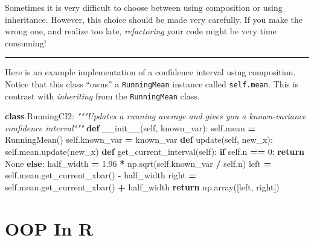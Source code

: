 \documentclass[
  12pt,
  krantz2]{krantz}
\makeatletter
\newenvironment{Shaded}{\begin{snugshade}}{\end{snugshade}}
\newcommand{\CommentTok}[1]{\textcolor[rgb]{0.37,0.37,0.37}{\textit{#1}}}
\newcommand{\ControlFlowTok}[1]{\textcolor[rgb]{0.27,0.27,0.27}{\textbf{#1}}}
\newcommand{\DecValTok}[1]{\textcolor[rgb]{0.06,0.06,0.06}{#1}}
\newcommand{\FloatTok}[1]{\textcolor[rgb]{0.06,0.06,0.06}{#1}}
\newcommand{\FunctionTok}[1]{\textcolor[rgb]{0,0,0}{#1}}
\newcommand{\KeywordTok}[1]{\textcolor[rgb]{0.27,0.27,0.27}{\textbf{#1}}}
\newcommand{\NormalTok}[1]{#1}
\newcommand{\OperatorTok}[1]{\textcolor[rgb]{0.43,0.43,0.43}{\textbf{#1}}}
\newcommand{\VariableTok}[1]{\textcolor[rgb]{0,0,0}{#1}}
\newenvironment{kframe}{%
\medskip{}
\setlength{\fboxsep}{.8em}
 \def\at@end@of@kframe{}%
 \ifinner\ifhmode%
  \def\at@end@of@kframe{\end{minipage}}%
  \begin{minipage}{\columnwidth}%
 \fi\fi%
 \def\FrameCommand##1{\hskip\@totalleftmargin \hskip-\fboxsep
 \colorbox{shadecolor}{##1}\hskip-\fboxsep
     \hskip-\linewidth \hskip-\@totalleftmargin \hskip\columnwidth}%
 \MakeFramed {\advance\hsize-\width
   \@totalleftmargin\z@ \linewidth\hsize
   \@setminipage}}%
 {\par\unskip\endMakeFramed%
 \at@end@of@kframe}
\renewenvironment{Shaded}{\begin{kframe}}{\end{kframe}}
\newenvironment{rmd-caution}{\begin{lrbox}{\rmdbox}
  \minipage[c]{\dimexpr \textwidth-2\fboxrule-\wd\excl-\columnsep}
    \vspace*{\columnsep}}%
{\vspace*{\columnsep}\endminipage\end{lrbox}%
  {\par\color{yellow}\fboxsep=0pt
    \fbox{\usebox\excl\usebox\rmdbox\hspace{\columnsep}}\par}}
\makeatother
\begin{document}
\begin{rmd-caution}
Sometimes it is very difficult to choose between using composition or using inheritance. However, this choice should be made very carefully. If you make the wrong one, and realize too late, \emph{refactoring} your code might be very time consuming!

\end{rmd-caution}

\begin{center}\rule{0.5\linewidth}{0.5pt}\end{center}

Here is an example implementation of a confidence interval using composition. Notice that this class ``owns'' a \texttt{RunningMean} instance called \texttt{self.mean}. This is contrast with \emph{inheriting} from the \texttt{RunningMean} class.

\begin{Shaded}
\begin{Highlighting}[]
\KeywordTok{class}\NormalTok{ RunningCI2:}
  \CommentTok{"""Updates a running average and }
\CommentTok{  gives you a known{-}variance confidence interval"""}
  \KeywordTok{def} \FunctionTok{\_\_init\_\_}\NormalTok{(}\VariableTok{self}\NormalTok{, known\_var):}
    \VariableTok{self}\NormalTok{.mean }\OperatorTok{=}\NormalTok{ RunningMean()}
    \VariableTok{self}\NormalTok{.known\_var }\OperatorTok{=}\NormalTok{ known\_var}
  \KeywordTok{def}\NormalTok{ update(}\VariableTok{self}\NormalTok{, new\_x):    }
    \VariableTok{self}\NormalTok{.mean.update(new\_x)}
  \KeywordTok{def}\NormalTok{ get\_current\_interval(}\VariableTok{self}\NormalTok{):}
    \ControlFlowTok{if} \VariableTok{self}\NormalTok{.n }\OperatorTok{==} \DecValTok{0}\NormalTok{:}
      \ControlFlowTok{return} \VariableTok{None}
    \ControlFlowTok{else}\NormalTok{:}
\NormalTok{      half\_width }\OperatorTok{=} \FloatTok{1.96} \OperatorTok{*}\NormalTok{ np.sqrt(}\VariableTok{self}\NormalTok{.known\_var }\OperatorTok{/} \VariableTok{self}\NormalTok{.n)  }
\NormalTok{      left }\OperatorTok{=} \VariableTok{self}\NormalTok{.mean.get\_current\_xbar() }\OperatorTok{{-}}\NormalTok{ half\_width}
\NormalTok{      right }\OperatorTok{=} \VariableTok{self}\NormalTok{.mean.get\_current\_xbar() }\OperatorTok{+}\NormalTok{ half\_width}
      \ControlFlowTok{return}\NormalTok{ np.array([left, right])}
\end{Highlighting}
\end{Shaded}

\hypertarget{oop-in-r}{%
\section{OOP In R}\label{oop-in-r}}
\end{document}
